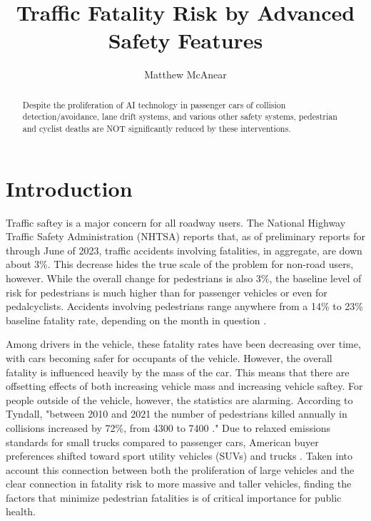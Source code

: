 \documentclass[12pt]{article}
\author{Matthew McAnear}
\title{Traffic Fatality Risk by Advanced Safety Features}
\begin{document}
\maketitle

\begin{abstract}
    Despite the proliferation of AI technology in passenger cars of collision detection/avoidance, lane drift systems, and
    various other safety systems, pedestrian and cyclist deaths are NOT significantly reduced by these
    interventions. 
\end{abstract}


\section{Introduction}

Traffic saftey is a major concern for all roadway users. The National Highway Traffic Safety Administration (NHTSA) reports
that, as of preliminary reports for through June of 2023, traffic accidents involving fatalities, in aggregate,
are down about 3\%. This decrease hides the true scale of the problem for non-road users, however. While the
overall change for pedestrians is also 3\%, the baseline level of risk for pedestrians is much higher than for 
passenger vehicles or even for pedalcyclists. Accidents involving pedestrians range anywhere from a 14\% to 
23\% baseline fatality rate, depending on the month in question \cite{national_center_for_statistics_and_analysis_early_2024}.

Among drivers in the vehicle, these fatality rates have been decreasing over time, with cars becoming
safer for occupants of the vehicle. However, the overall fatality is influenced heavily by the mass of the 
car\cite{evans_car_1992}. This means that there are offsetting effects of both increasing vehicle mass and increasing 
vehicle saftey. For people outside of the vehicle, however, the statistics are alarming. According to Tyndall, 
"between 2010 and 2021 the number of pedestrians killed annually in collisions increased by 72\%, from 4300 to 
7400 \cite{tyndall_effect_2024}." Due to relaxed emissions standards for small trucks compared to passenger cars,
American buyer preferences shifted toward sport utility vehicles (SUVs) and trucks \cite{kovach_rise_2021}. Taken into 
account this connection between both the proliferation of large vehicles and the clear connection in fatality risk to
more massive and taller vehicles\cite{tyndall_effect_2024}, finding the factors that minimize pedestrian fatalities
is of critical importance for public health.
\end{document}
